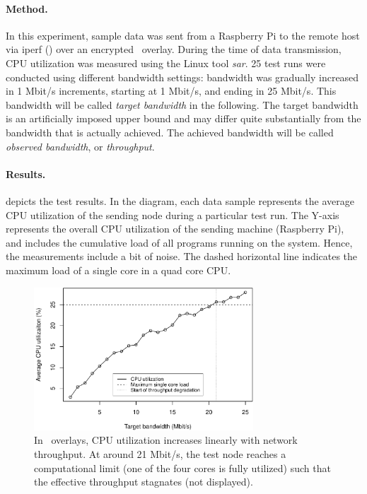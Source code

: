 \paragraph{Method.} In this experiment, sample data was sent from a Raspberry Pi to the remote host via iperf (\cf {}) over an encrypted \wnet\ overlay. During the time of data transmission, CPU utilization was measured using the Linux tool \emph{sar}. 25 test runs were conducted using different bandwidth settings: bandwidth was gradually increased in 1 Mbit/s increments, starting at 1 Mbit/s, and ending in 25 Mbit/s. This bandwidth will be called \emph{target bandwidth} in the following. The target bandwidth is an artificially imposed upper bound and may differ quite substantially from the bandwidth that is actually achieved. The achieved bandwidth will be called \emph{observed bandwidth}, or \emph{throughput}.

\paragraph{Results.}
 depicts the test results. In the diagram, each data sample represents the average CPU utilization of the sending node during a particular test run. The Y-axis represents the overall CPU utilization of the sending machine (Raspberry Pi), and includes the cumulative load of all programs running on the system. Hence, the measurements include a bit of noise. The dashed horizontal line indicates the maximum load of a single core in a quad core CPU.
\begin{figure}[htpb]
  \centering
  \includegraphics[width=0.73\textwidth]{figures/cpu}
  \caption[\weave\ CPU utilization test results]{In \weave\ overlays, CPU utilization increases linearly with network throughput. At around 21 Mbit/s, the test node reaches a computational limit (one of the four cores is fully utilized) such that the effective throughput stagnates (not displayed).}\label{fig:cpu}
\end{figure}

